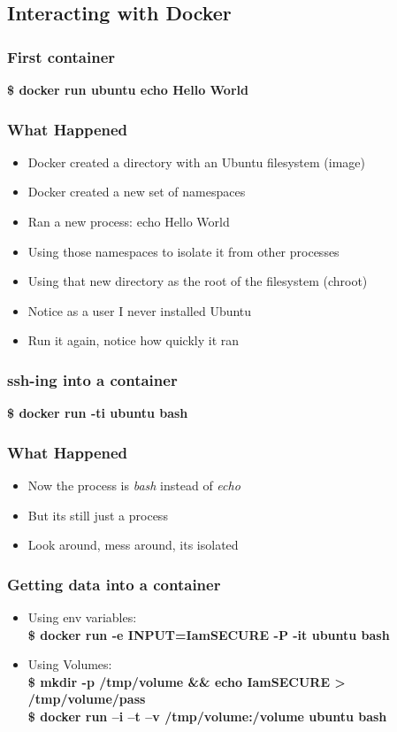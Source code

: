 \documentclass[aspectratio=169,11pt,hyperref={colorlinks=true}]{beamer}
\begin{document}
\subsection{Interacting with Docker}
\begin{frame}
    \frametitle{First container}
    {\LARGE \textbf{\$ docker run ubuntu echo Hello World}} \\
\end{frame}

\begin{frame}
    \frametitle{What Happened}
    \begin{itemize}
        \item Docker created a directory with an Ubuntu filesystem (image)
        \item Docker created a new set of namespaces
        \item Ran a new process: echo Hello World
        \item Using those namespaces to isolate it from other processes
        \item Using that new directory as the root of the filesystem (chroot)
        \item Notice as a user I never installed Ubuntu
        \item Run it again, notice how quickly it ran
    \end{itemize}
\end{frame}

\begin{frame}
    \frametitle{ssh-ing into a container}
    {\LARGE \textbf{\$ docker run -ti ubuntu bash}}
\end{frame}

\begin{frame}
    \frametitle{What Happened}
    \begin{itemize}
        \item Now the process is \textit{bash} instead of \textit{echo}
        \item But its still just a process
        \item Look around, mess around, its isolated
    \end{itemize}
\end{frame}

\begin{frame}
    \frametitle{Getting data into a container}
    \begin{itemize}
        \item Using env variables: \\
           \textbf{\$ docker run -e INPUT=IamSECURE -P -it ubuntu bash}
       \item Using Volumes: \\
           \textbf{\$ mkdir -p /tmp/volume \&\& echo IamSECURE > /tmp/volume/pass}\\
           \textbf{\$ docker run –i –t –v /tmp/volume:/volume ubuntu bash}
    \end{itemize}
\end{frame}
\end{document}
